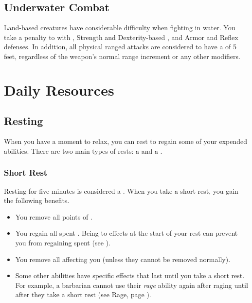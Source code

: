     \subsection{Underwater Combat}\label{Underwater Combat}
        Land-based creatures have considerable difficulty when fighting in water.
        You take a  penalty to  with , Strength and Dexterity-based , and Armor and Reflex defenses.
        In addition, all physical ranged attacks are considered to have a  of 5 feet, regardless of the weapon's normal range increment or any other modifiers.

\section{Daily Resources}

    \subsection{Resting}\label{Resting}
        When you have a moment to relax, you can rest to regain some of your expended abilities.
        There are two main types of rests: a  and a .

        \subsubsection{Short Rest}\label{Short Rest}
            Resting for five minutes is considered a .
            When you take a short rest, you gain the following benefits.
            \begin{itemize}
                \item You remove all points of .
                \item You regain all spent .
                    Being  to effects at the start of your rest can prevent you from regaining spent  (see ).
                \item You remove all  affecting you (unless they cannot be removed normally).
                \item Some other abilities have specific effects that last until you take a short rest.
                    For example, a barbarian cannot use their \textit{rage} ability again after raging until after they take a short rest (see Rage, page ).
            \end{itemize}

